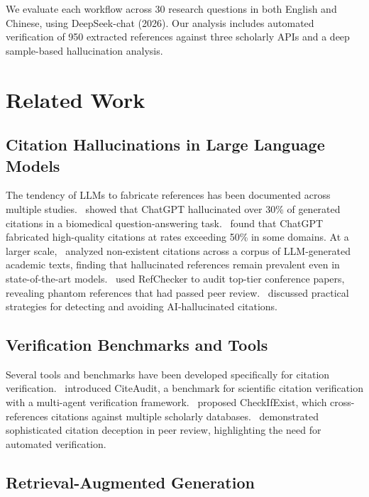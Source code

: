 \documentclass[11pt,a4paper]{article}
\begin{document}
We evaluate each workflow across 30 research questions in both English and Chinese, using DeepSeek-chat (2026). Our analysis includes automated verification of 950 extracted references against three scholarly APIs and a deep sample-based hallucination analysis.

\section{Related Work}
\label{sec:related}

\subsection{Citation Hallucinations in Large Language Models}

The tendency of LLMs to fabricate references has been documented across multiple studies.~\cite{zuccon2023hallucinates} showed that ChatGPT hallucinated over 30\% of generated citations in a biomedical question-answering task.~\cite{walters2023fabrication} found that ChatGPT fabricated high-quality citations at rates exceeding 50\% in some domains. At a larger scale,~\cite{zhao2026hallucinations} analyzed non-existent citations across a corpus of LLM-generated academic texts, finding that hallucinated references remain prevalent even in state-of-the-art models.~\cite{russinovich2026phantom} used RefChecker to audit top-tier conference papers, revealing phantom references that had passed peer review.~\cite{glynn2025guarding} discussed practical strategies for detecting and avoiding AI-hallucinated citations.

\subsection{Verification Benchmarks and Tools}

Several tools and benchmarks have been developed specifically for citation verification.~\cite{yuan2026citeaudit} introduced CiteAudit, a benchmark for scientific citation verification with a multi-agent verification framework.~\cite{abbonato2026checkifexist} proposed CheckIfExist, which cross-references citations against multiple scholarly databases.~\cite{ansari2026compound} demonstrated sophisticated citation deception in peer review, highlighting the need for automated verification.

\subsection{Retrieval-Augmented Generation}
\end{document}
